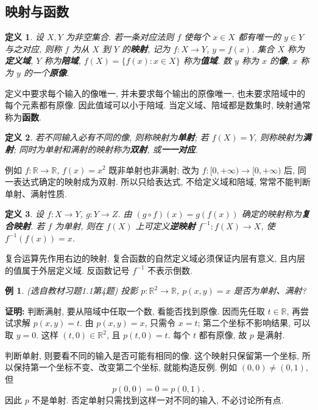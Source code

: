 \documentclass[UTF8,openany]{ctexbook}
\theoremstyle{chinesetextbook}
\newtheorem{definition}{定义}[section]
\newtheorem{example}{例}[section]
\newenvironment{cnproof}{\par\indent\textbf{证明:} \ignorespaces}{\par}
\begin{document}
\subsection{映射与函数}
\begin{definition}
设 $X,Y$ 为非空集合. 若一条对应法则 $f$ 使每个 $x\in X$ 都有唯一的 $y\in Y$ 与之对应, 则称 $f$ 为从 $X$ 到 $Y$ 的\textbf{映射}, 记为 $f:X\to Y$, $y=f(x)$. 集合 $X$ 称为\textbf{定义域}, $Y$ 称为\textbf{陪域}, $f(X)=\{f(x):x\in X\}$ 称为\textbf{值域}. 数 $y$ 称为 $x$ 的\textbf{像}, $x$ 称为 $y$ 的一个\textbf{原像}.
\end{definition}
定义中要求每个输入的像唯一, 并未要求每个输出的原像唯一, 也未要求陪域中的每个元素都有原像. 因此值域可以小于陪域. 当定义域、陪域都是数集时, 映射通常称为\textbf{函数}.
\begin{definition}
若不同输入必有不同的像, 则称映射为\textbf{单射}; 若 $f(X)=Y$, 则称映射为\textbf{满射}; 同时为单射和满射的映射称为\textbf{双射}, 或\textbf{一一对应}.
\end{definition}
例如 $f:\mathbb R\to\mathbb R$, $f(x)=x^2$ 既非单射也非满射; 改为 $f:[0,+\infty)\to[0,+\infty)$ 后, 同一表达式确定的映射成为双射. 所以只给表达式, 不给定义域和陪域, 常常不能判断单射、满射性质.
\begin{definition}
设 $f:X\to Y$, $g:Y\to Z$. 由 $(g\circ f)(x)=g(f(x))$ 确定的映射称为\textbf{复合映射}. 若 $f$ 为单射, 则在 $f(X)$ 上可定义\textbf{逆映射} $f^{-1}:f(X)\to X$, 使 $f^{-1}(f(x))=x$.
\end{definition}
复合运算先作用右边的映射. 复合函数的自然定义域必须保证内层有意义, 且内层的值属于外层定义域. 反函数记号 $f^{-1}$ 不表示倒数.
\begin{example}
(选自教材习题1.1第4题) 投影 $p:\mathbb R^2\to\mathbb R$, $p(x,y)=x$ 是否为单射、满射?
\end{example}
\begin{cnproof}
判断满射, 要从陪域中任取一个数, 看能否找到原像. 因而先任取 $t\in\mathbb R$, 再尝试求解 $p(x,y)=t$. 由 $p(x,y)=x$, 只需令 $x=t$; 第二个坐标不影响结果, 可以取 $y=0$. 这样 $(t,0)\in\mathbb R^2$, 且 $p(t,0)=t$. 每个 $t$ 都有原像, 故 $p$ 是满射.

判断单射, 则要看不同的输入是否可能有相同的像. 这个映射只保留第一个坐标, 所以保持第一个坐标不变、改变第二个坐标, 就能构造反例. 例如 $(0,0)\ne(0,1)$, 但
\[
p(0,0)=0=p(0,1).
\]
因此 $p$ 不是单射. 否定单射只需找到这样一对不同的输入, 不必讨论所有点.
\end{cnproof}
\end{document}
